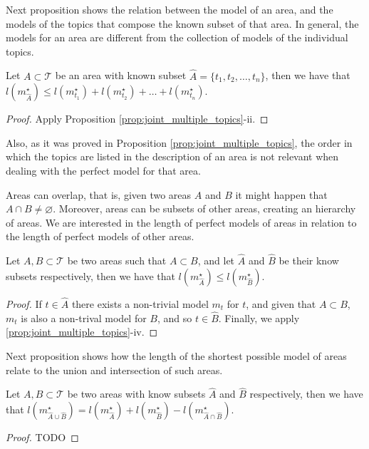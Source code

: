 Next proposition shows the relation between the model of an area, and the models of the topics that compose the known subset of that area. In general, the models for an area are different from the collection of models of the individual topics.

\begin{proposition}
Let $A \subset \mathcal{T}$ be an area with known subset $\hat{A} = \{t_1, t_2, \ldots, t_n\}$, then we have that $l \left( m_{\hat{A}}^{\star} \right) \leq l(m_ {t_1}^\star) + l(m_ {t_2}^\star) + \ldots + l(m_ {t_n}^\star)$.
\end{proposition}
\begin{proof}
Apply Proposition \ref{prop:joint_multiple_topics}-ii. 
\end{proof}

Also, as it was proved in Proposition \ref{prop:joint_multiple_topics}, the order in which the topics are listed in the description of an area is not relevant when dealing with the perfect model for that area.

Areas can overlap, that is, given two areas $A$ and $B$ it might happen that $A \cap B \neq \varnothing$. Moreover, areas can be subsets of other areas, creating an hierarchy of areas. We are interested in the length of perfect models of areas in relation to the length of perfect models of other areas.

\begin{proposition}
Let $A, B \subset \mathcal{T}$ be two areas such that $A \subset B$, and let $\hat{A}$ and $\hat{B}$ be their know subsets respectively, then we have that $l \left( m_{\hat{A}}^{\star} \right) \leq l \left( m_{\hat{B}}^{\star} \right)$.
\end{proposition}
\begin{proof}
If $t \in \hat{A}$ there exists a non-trivial model $m_t$ for $t$, and given that $A \subset B$, $m_t$ is also a non-trival model for $B$, and so $t \in \hat{B}$. Finally, we apply \ref{prop:joint_multiple_topics}-iv.
\end{proof}

Next proposition \label{prop:areas_union} shows how the length of the shortest possible model of areas relate to the union and intersection of such areas.

\begin{proposition}
\label{prop:areas_union}
Let $A, B \subset \mathcal{T}$ be two areas with know subsets $\hat{A}$ and $\hat{B}$ respectively, then we have that $l \left( m_{\hat{A} \cup \hat{B}}^{\star} \right) = l \left( m_{\hat{A}}^{\star} \right) + l \left( m_{\hat{B}}^{\star} \right) - l \left( m_{\hat{A} \cap \hat{B}}^{\star} \right)$.
\end{proposition}
\begin{proof}
{\color{red} TODO}
\end{proof}

